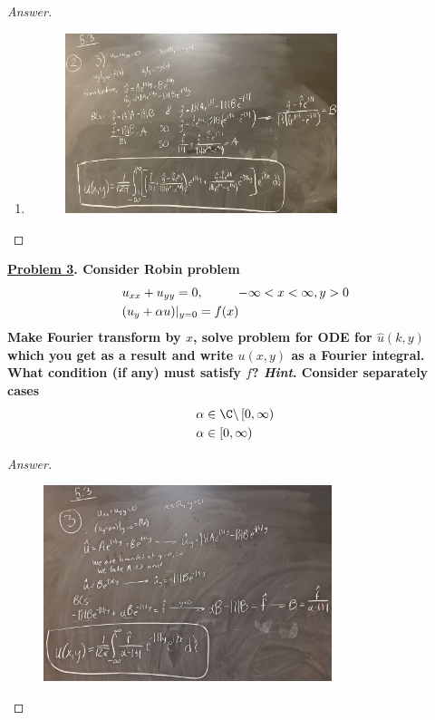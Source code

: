 \documentclass{article}
\theoremstyle{definition}
\renewcommand\qedsymbol{$\blacksquare$}
\newenvironment{ans}{\begin{proof}[Answer]\renewcommand{\qedsymbol}{}}{\end{proof}}
\newenvironment{boldenv}{\bfseries\boldmath}{}
\begin{document}
\begin{ans}
\begin{enumerate}
        \item \phantom{.}
        \begin{figure}[H]
            \centering
            \includegraphics[width = 0.75\textwidth]{Problem 2 Part 3.jpeg}
        \end{figure}
    \end{enumerate}
\end{ans}

\begin{boldenv}
    \underline{Problem 3}. Consider Robin problem \begin{align}
        & u_{xx} + u_{yy} = 0, \mkern 50mu -\infty < x < \infty, y > 0\\
        & (u_y + \alpha u)|_{y=0} = f(x)
    \end{align}
    Make Fourier transform by $x$, solve problem for ODE for $\hat{u}(k, y)$ which you get as a result and write $u(x,y)$ as a Fourier integral. What condition (if any) must satisfy $f$?
    \textit{Hint}. Consider separately cases 
    \begin{align*}
        & \alpha \in \C \backslash \left[0, \infty \right)\\
        & \alpha \in \left[0, \infty \right)
    \end{align*}
\end{boldenv}
\begin{ans}
    \phantom{.}
        \begin{figure}[H]
            \centering
            \includegraphics[width = 0.75\textwidth]{Problem 3.jpeg}
        \end{figure}
\end{ans}
\end{document}
